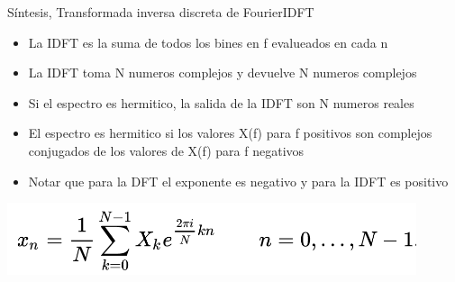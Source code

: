 \begin{frame}{Síntesis, Transformada inversa discreta de Fourier}{IDFT}
   \begin{itemize}
      \item{La IDFT es la suma de todos los bines en f evalueados en cada n}
      \item{La IDFT toma N numeros complejos y devuelve N numeros complejos}
      \item{Si el espectro es hermitico, la salida de la IDFT son N numeros reales}
      \item{El espectro es hermitico si los valores X(f) para f positivos son complejos conjugados de los valores de X(f) para f negativos}
      \item{Notar que para la DFT el exponente es negativo y para la IDFT es positivo}
   \end{itemize}
   \center\includegraphics[width=0.9\textwidth]{4_clase/idft_eq}
   \vfill
 \end{frame}
